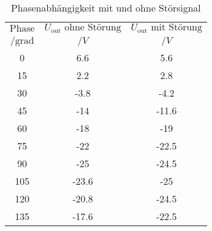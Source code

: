 \begin{table}[H]
  \centering
  \caption{Phasenabhängigkeit mit und ohne Störsignal}
  \label{tab:data1}
  \begin{tabular}{S[table-format=3.0] S S}
    \toprule
    {$\text{Phase}$}&{$U_\text{out}\text{ ohne Störung}$}&{$U_\text{out}\text{ mit Störung}$} \\
    {$/\text{grad}$}&{$/V$}&{$/V$} \\
     &   6.6 &   5.6 \\
   15 &   2.2 &   2.8 \\
   30 &  -3.8 &  -4.2 \\
   45 & -14   & -11.6 \\
   60 & -18   & -19   \\
   75 & -22   & -22.5 \\
   90 & -25   & -24.5 \\
  105 & -23.6 & -25   \\
  120 & -20.8 & -24.5 \\
  135 & -17.6 & -22.5 \\
    \bottomrule
  \end{tabular}
\end{table}

